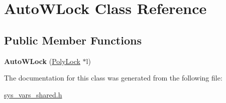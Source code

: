\hypertarget{classAutoWLock}{}\section{Auto\+W\+Lock Class Reference}
\label{classAutoWLock}
\subsection*{Public Member Functions}
\begin{DoxyCompactItemize}
\item 
\mbox{\label{classAutoWLock_a4c06b5e5f1dd66f5dadcbc095eef7a2c}} 
{\bfseries Auto\+W\+Lock} (\mbox{\hyperlink{classPolyLock}{Poly\+Lock}} $\ast$l)
\end{DoxyCompactItemize}


The documentation for this class was generated from the following file\+:\begin{DoxyCompactItemize}
\item 
\mbox{\hyperlink{sys__vars__shared_8h}{sys\+\_\+vars\+\_\+shared.\+h}}\end{DoxyCompactItemize}
